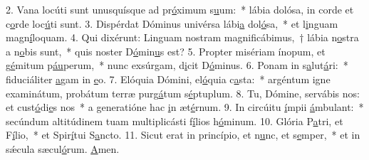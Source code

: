 2. Vana locúti sunt unusquísque ad pr\uline{ó}ximum s\uline{u}um:~* lábia dolósa, in corde et c\uline{o}rde loc\uline{ú}ti sunt.
3. Dispérdat Dóminus univérsa lábi\uline{a} dol\uline{ó}sa,~* et l\uline{i}nguam magn\uline{í}loquam.
4. Qui dixérunt: Linguam nostram magnificábimus,~† lábia n\uline{o}stra a n\uline{o}bis sunt,~* quis noster D\uline{ó}min\uline{u}s est?
5. Propter misériam ínopum, et g\uline{é}mitum p\uline{áu}perum,~* nunc exsúrgam, d\uline{i}cit D\uline{ó}minus.
6. Ponam in s\uline{a}lut\uline{á}ri:~* fiduciáliter \uline{a}gam in \uline{e}o.
7. Elóquia Dómini, el\uline{ó}quia c\uline{a}sta:~* argéntum igne examinátum, probátum terræ purg\uline{á}tum s\uline{é}ptuplum.
8. Tu, Dómine, servábis nos: et cust\uline{ó}di\uline{e}s nos~* a generatióne hac \uline{i}n æt\uline{é}rnum.
9. In circúitu \uline{í}mpii \uline{á}mbulant:~* secúndum altitúdinem tuam multiplicásti f\uline{í}lios h\uline{ó}minum.
10. Glória P\uline{a}tri, et F\uline{í}lio,~* et Spir\uline{í}tui S\uline{a}ncto.
11. Sicut erat in princípio, et n\uline{u}nc, et s\uline{e}mper,~* et in sǽcula sæcul\uline{ó}rum. \uline{A}men.
